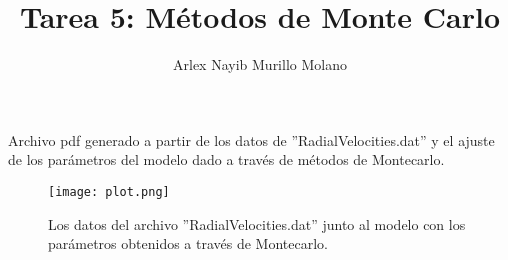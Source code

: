 \documentclass[a4paper,10pt]{article}
\title{Tarea 5: Métodos de Monte Carlo}
\author{Arlex Nayib Murillo Molano}
\begin{document}
\maketitle

Archivo pdf generado a partir de los datos de ''RadialVelocities.dat'' y el ajuste de los parámetros del modelo dado a través de métodos de Montecarlo.

\medskip


\begin{figure}[h]
\texttt{[image: plot.png]}
\caption{Los datos del archivo ''RadialVelocities.dat'' junto al modelo con los parámetros obtenidos a través de Montecarlo.}
\end{figure}
\end{document}
